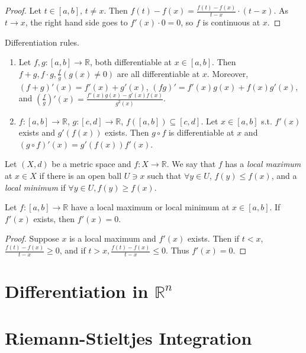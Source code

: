 \documentclass[11pt]{article}
\begin{document}
      \begin{proof} Let $t \in [a, b]$, $t \neq x$. Then $f(t) - f(x) = \frac{f(t) - f(x)}{t - x} \cdot (t - x)$. As $t \to x$, the right hand side goes to $f'(x) \cdot 0 = 0$, so $f$ is continuous at $x$.
      \end{proof}

      Differentiation rules. \begin{enumerate}
      \item Let $f, g: [a, b] \to \mathbb{R}$, both differentiable at $x \in [a, b]$. Then $f + g, f  \cdot g, \frac{f}{g} (g(x) \neq 0)$ are all differentiable at $x$. Moreover, $(f + g)'(x) = f'(x) + g'(x)$, $(fg)' = f'(x)g(x) + f(x)g'(x)$, and $\left( \frac{f}{g} \right)'(x) = \frac{f'(x)g(x) - g'(x)f(x)}{g^2(x)}$.
      \item $f: [a, b] \to \mathbb{R}$, $g: [c, d] \to \mathbb{R}$, $f([a, b]) \subseteq [c, d]$. Let $x \in [a, b]$ s.t. $f'(x)$ exists and $g'(f(x))$ exists. Then $g \circ f$ is differentiable at $x$ and $(g \circ f)'(x) = g'(f(x)) f'(x)$.
      \end{enumerate}

      \begin{definition}
        Let $(X, d)$ be a metric space and $f: X \to \mathbb{R}$. We say that $f$ has a \emph{local maximum} at $x \in X$ if there is an open ball $U \ni x$ such that $\forall y \in U$, $f(y) \le f(x)$, and a \emph{local minimum} if $\forall y \in U, f(y) \ge f(x)$.
      \end{definition}

      \begin{theorem} Let $f: [a, b] \to \mathbb{R}$ have a local maximum or local minimum at $x \in [a, b]$. If $f'(x)$ exists, then $f'(x) = 0$. 
      \end{theorem}

      \begin{proof} Suppose $x$ is a local maximum and $f'(x)$ exists. Then if $t < x$, $\frac{f(t) - f(x)}{t - x} \ge 0$, and if $t > x, \frac{f(t) - f(x)}{t - x} \le 0$. Thus $f'(x) = 0$.
        \end{proof}
      
        \section{Differentiation in $\mathbb{R}^n$}

        \section{Riemann-Stieltjes Integration}
        
\end{document}
